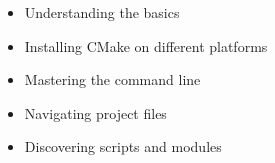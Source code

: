 \begin{itemize}
\item
Understanding the basics

\item
Installing CMake on different platforms

\item
Mastering the command line

\item
Navigating project files

\item
Discovering scripts and modules
\end{itemize}
























